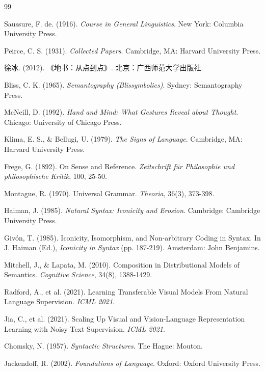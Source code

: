 \documentclass[a4paper,12pt]{article}
\begin{document}
\begin{thebibliography}{99}

 Saussure, F. de. (1916). \textit{Course in General Linguistics}. New York: Columbia University Press.

 Peirce, C. S. (1931). \textit{Collected Papers}. Cambridge, MA: Harvard University Press.

 徐冰. (2012). 《地书：从点到点》. 北京：广西师范大学出版社.

 Bliss, C. K. (1965). \textit{Semantography (Blissymbolics)}. Sydney: Semantography Press.

 McNeill, D. (1992). \textit{Hand and Mind: What Gestures Reveal about Thought}. Chicago: University of Chicago Press.

 Klima, E. S., \& Bellugi, U. (1979). \textit{The Signs of Language}. Cambridge, MA: Harvard University Press.

 Frege, G. (1892). On Sense and Reference. \textit{Zeitschrift für Philosophie und philosophische Kritik}, 100, 25-50.

 Montague, R. (1970). Universal Grammar. \textit{Theoria}, 36(3), 373-398.

 Haiman, J. (1985). \textit{Natural Syntax: Iconicity and Erosion}. Cambridge: Cambridge University Press.

 Givón, T. (1985). Iconicity, Isomorphism, and Non-arbitrary Coding in Syntax. In J. Haiman (Ed.), \textit{Iconicity in Syntax} (pp. 187-219). Amsterdam: John Benjamins.

 Mitchell, J., \& Lapata, M. (2010). Composition in Distributional Models of Semantics. \textit{Cognitive Science}, 34(8), 1388-1429.

 Radford, A., et al. (2021). Learning Transferable Visual Models From Natural Language Supervision. \textit{ICML 2021}.

 Jia, C., et al. (2021). Scaling Up Visual and Vision-Language Representation Learning with Noisy Text Supervision. \textit{ICML 2021}.

 Chomsky, N. (1957). \textit{Syntactic Structures}. The Hague: Mouton.

 Jackendoff, R. (2002). \textit{Foundations of Language}. Oxford: Oxford University Press.


\end{thebibliography}
\end{document}

